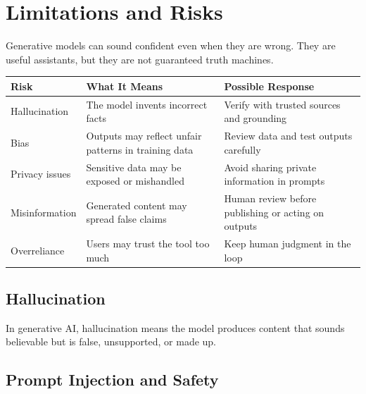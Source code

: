 \documentclass[11pt,a4paper]{article}
\begin{document}
\section{Limitations and Risks}

\begin{alertbox}
Generative models can sound confident even when they are wrong. They are useful assistants, but they are not guaranteed truth machines.
\end{alertbox}

\begin{longtable}{@{}p{3.2cm}p{4.0cm}p{6.1cm}@{}}
\toprule
\rowcolor{primary!15}
\textbf{Risk} & \textbf{What It Means} & \textbf{Possible Response} \\
\midrule
\endhead
Hallucination & The model invents incorrect facts & Verify with trusted sources and grounding \\
\addlinespace
Bias & Outputs may reflect unfair patterns in training data & Review data and test outputs carefully \\
\addlinespace
Privacy issues & Sensitive data may be exposed or mishandled & Avoid sharing private information in prompts \\
\addlinespace
Misinformation & Generated content may spread false claims & Human review before publishing or acting on outputs \\
\addlinespace
Overreliance & Users may trust the tool too much & Keep human judgment in the loop \\
\bottomrule
\end{longtable}

\subsection{Hallucination}

\begin{definitionbox}[Hallucination]
In generative AI, hallucination means the model produces content that sounds believable but is false, unsupported, or made up.
\end{definitionbox}

\subsection{Prompt Injection and Safety}
\end{document}
